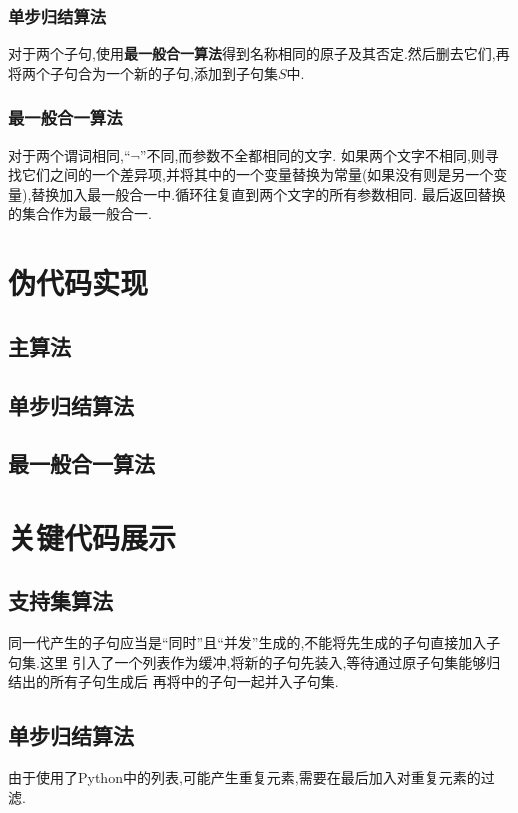     \subsubsection{单步归结算法}
    对于两个子句,使用\textbf{最一般合一算法}得到名称相同的原子及其否定.然后删去它们,再将两个子句合为一个新的子句,添加到子句集\(S\)中.
    \subsubsection{最一般合一算法}
    对于两个谓词相同,``\(\neg\)''不同,而参数不全都相同的文字.
    如果两个文字不相同,则寻找它们之间的一个差异项,并将其中的一个变量替换为常量(如果没有则是另一个变量),替换加入最一般合一中.循环往复直到两个文字的所有参数相同.
    最后返回替换的集合作为最一般合一.
    \section{伪代码实现}
    \subsection{主算法}
    
    \clearpage
    \subsection{单步归结算法}
    
    \subsection{最一般合一算法}
    

    \section{关键代码展示}
    \subsection{支持集算法}
    同一代产生的子句应当是``同时''且``并发''生成的,不能将先生成的子句直接加入子句集.这里
    引入了一个列表作为缓冲,将新的子句先装入,等待通过原子句集能够归结出的所有子句生成后
    再将中的子句一起并入子句集.

    \subsection{单步归结算法}
    由于使用了Python中的列表,可能产生重复元素,需要在最后加入对重复元素的过滤.

